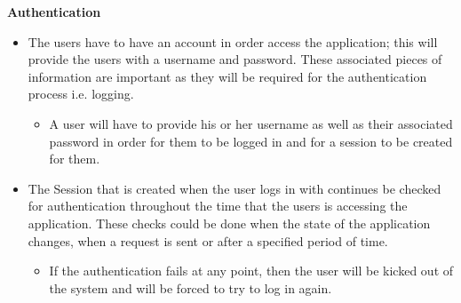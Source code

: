 \documentclass[10pt,a4paper]{article}
\begin{document}
\begin{center}\textbf{Authentication}\end{center}
                \begin{itemize}
                        \item The users have to have an account in order access the application; this will provide the users with a username and password. These associated pieces of information are important as they will be required for the authentication process i.e. logging.
                        \begin{itemize}
                                \item A user will have to provide his or her username as well as their associated password in order for them to be logged in and for a session to be created for them.
                        \end{itemize}
                \end{itemize}
                \begin{itemize}
                        \item The Session that is created when the user logs in with continues be checked for authentication throughout the time that the users is accessing the application. These checks could be done when the state of the application changes, when a request is sent or after a specified period of time.
                        \begin{itemize}
                                \item If the authentication fails at any point, then the user will be kicked out of the system and will be forced to try to log in again.
                        \end{itemize}
                \end{itemize}
\end{document}
